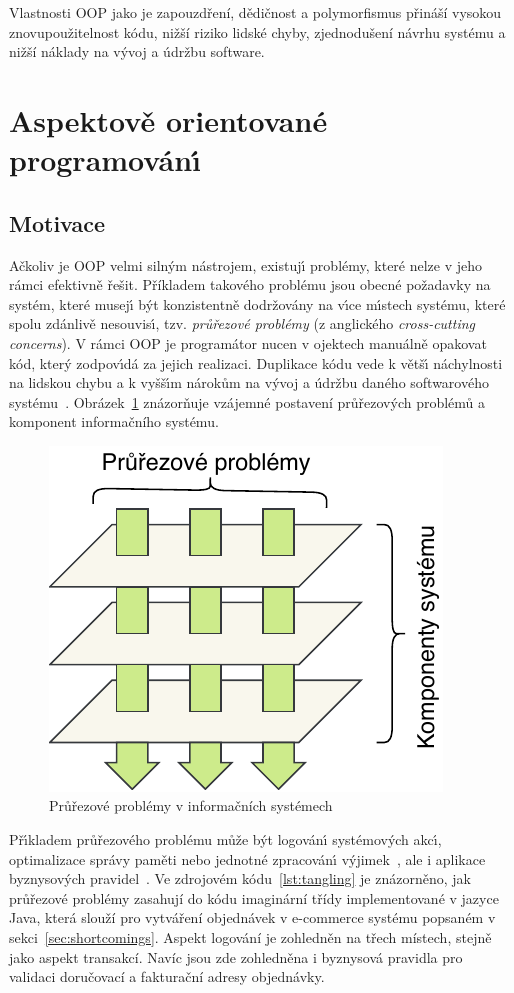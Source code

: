 Vlastnosti \gls{OOP} jako je zapouzdření, dědičnost a polymorfismus přináší
vysokou znovupoužitelnost kódu, nižší riziko lidské chyby, zjednodušení
návrhu systému a nižší náklady na vývoj a údržbu software.

\section{Aspektově orientované programován\'{\i}}\label{sec:aop}

\subsection{Motivace}

Ačkoliv je \gls{OOP} velmi siln\'ym nástrojem, existuj\'{\i} problémy,
které nelze v jeho rámci efektivně řešit.
Příkladem takového problému jsou obecné požadavky na systém,
které musej\'{\i} b\'yt konzistentně dodržovány na v\'{\i}ce
m\'{\i}stech systému, které spolu zdánlivě nesouvis\'{\i},
tzv. \textit{průřezové problémy} (z anglického \textit{cross-cutting concerns}).
V rámci \gls{OOP} je programátor nucen v ojektech manuálně opakovat
kód, kter\'y zodpov\'{\i}dá za jejich realizaci. Duplikace kódu
vede k větš\'{\i} náchylnosti na lidskou chybu a k vyšš\'{\i}m nárokům na v\'yvoj
a údržbu daného softwarového systému~\cite{fowler1999refactoring}.
Obrázek~\ref{fig:cross-cutting} znázorňuje vzájemné postavení průřezových
problémů a komponent informačního systému.

\begin{figure}[t]
    \centering
    \includegraphics[keepaspectratio=true, width=0.35\linewidth]{figures/cross-cutting.pdf}
    \caption{Průřezové problémy v informačních systémech}
    \label{fig:cross-cutting}
\end{figure}

Př\'{\i}kladem průřezového problému může b\'yt logován\'{\i}
systémov\'ych akc\'{\i}, optimalizace správy paměti
nebo jednotné zpracován\'{\i} v\'yjimek~\cite{kiczales1997aspect},
ale i aplikace byznysových pravidel~\cite{cemus2014aspect}.
Ve zdrojovém kódu~\ref{lst:tangling} je znázorněno, jak průřezové
problémy zasahují do kódu imaginární třídy implementované v
jazyce Java, která slouží pro vytváření objednávek v e-commerce
systému popsaném v sekci~\ref{sec:shortcomings}.
Aspekt logování je zohledněn na třech místech, stejně jako aspekt transakcí.
Navíc jsou zde zohledněna i byznysová pravidla pro validaci doručovací
a fakturační adresy objednávky.

